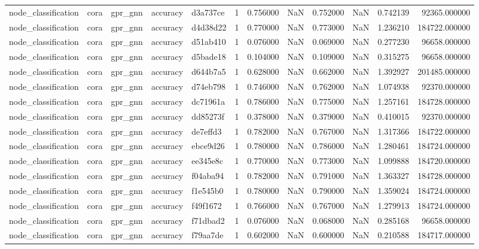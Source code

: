 \begin{tabular}{lllllrrrrrrr}
node_classification & cora & gpr_gnn & accuracy & d3a737ce & 1 & 0.756000 & NaN & 0.752000 & NaN & 0.742139 & 92365.000000 \\
node_classification & cora & gpr_gnn & accuracy & d4d38d22 & 1 & 0.770000 & NaN & 0.773000 & NaN & 1.236210 & 184722.000000 \\
node_classification & cora & gpr_gnn & accuracy & d51ab410 & 1 & 0.076000 & NaN & 0.069000 & NaN & 0.277230 & 96658.000000 \\
node_classification & cora & gpr_gnn & accuracy & d5bade18 & 1 & 0.104000 & NaN & 0.109000 & NaN & 0.315275 & 96658.000000 \\
node_classification & cora & gpr_gnn & accuracy & d644b7a5 & 1 & 0.628000 & NaN & 0.662000 & NaN & 1.392927 & 201485.000000 \\
node_classification & cora & gpr_gnn & accuracy & d74eb798 & 1 & 0.746000 & NaN & 0.762000 & NaN & 1.074938 & 92370.000000 \\
node_classification & cora & gpr_gnn & accuracy & dc71961a & 1 & 0.786000 & NaN & 0.775000 & NaN & 1.257161 & 184728.000000 \\
node_classification & cora & gpr_gnn & accuracy & dd85273f & 1 & 0.378000 & NaN & 0.379000 & NaN & 0.410015 & 92370.000000 \\
node_classification & cora & gpr_gnn & accuracy & de7effd3 & 1 & 0.782000 & NaN & 0.767000 & NaN & 1.317366 & 184722.000000 \\
node_classification & cora & gpr_gnn & accuracy & ebce9d26 & 1 & 0.780000 & NaN & 0.786000 & NaN & 1.280461 & 184724.000000 \\
node_classification & cora & gpr_gnn & accuracy & ee345e8c & 1 & 0.770000 & NaN & 0.773000 & NaN & 1.099888 & 184720.000000 \\
node_classification & cora & gpr_gnn & accuracy & f04aba94 & 1 & 0.782000 & NaN & 0.791000 & NaN & 1.363327 & 184728.000000 \\
node_classification & cora & gpr_gnn & accuracy & f1e545b0 & 1 & 0.780000 & NaN & 0.790000 & NaN & 1.359024 & 184724.000000 \\
node_classification & cora & gpr_gnn & accuracy & f49f1672 & 1 & 0.766000 & NaN & 0.767000 & NaN & 1.279913 & 184724.000000 \\
node_classification & cora & gpr_gnn & accuracy & f71dbad2 & 1 & 0.076000 & NaN & 0.068000 & NaN & 0.285168 & 96658.000000 \\
node_classification & cora & gpr_gnn & accuracy & f79aa7de & 1 & 0.602000 & NaN & 0.600000 & NaN & 0.210588 & 184717.000000 \\

\end{tabular}

